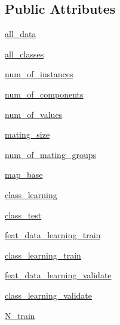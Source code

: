 \subsection*{Public Attributes}
\begin{DoxyCompactItemize}
\item 
\hyperlink{classmate__learning_1_1_mate_finder_a7347330ac72c85afd3f9fca87640d294}{all\+\_\+data}
\item 
\hyperlink{classmate__learning_1_1_mate_finder_a964c20920e14dfc4d5091142d429fe06}{all\+\_\+classes}
\item 
\hyperlink{classmate__learning_1_1_mate_finder_aeb435fdde37e9ac0cf72d03c25369201}{num\+\_\+of\+\_\+instances}
\item 
\hyperlink{classmate__learning_1_1_mate_finder_aaf6a72d379804901e89dc1c3e5ae5fd4}{num\+\_\+of\+\_\+components}
\item 
\hyperlink{classmate__learning_1_1_mate_finder_ad876941a4f4bf2e1dda05bf4881861e4}{num\+\_\+of\+\_\+values}
\item 
\hyperlink{classmate__learning_1_1_mate_finder_ac9e474a0c97351549960cd8baf0bbe24}{mating\+\_\+size}
\item 
\hyperlink{classmate__learning_1_1_mate_finder_a56553c3120e135bb4a969fd445f6bf6b}{num\+\_\+of\+\_\+mating\+\_\+groups}
\item 
\hyperlink{classmate__learning_1_1_mate_finder_af4f8fcfed10a8658bf2216f0deab368e}{map\+\_\+base}
\item 
\hyperlink{classmate__learning_1_1_mate_finder_a1d13f05feb21a3e48bf8822bf9c9fa67}{class\+\_\+learning}
\item 
\hyperlink{classmate__learning_1_1_mate_finder_a3fe8edaa8b6704d94252c2d1fc5b3360}{class\+\_\+test}
\item 
\hyperlink{classmate__learning_1_1_mate_finder_a04fe666220e1331ae3c444f3e8f6e3d3}{feat\+\_\+data\+\_\+learning\+\_\+train}
\item 
\hyperlink{classmate__learning_1_1_mate_finder_affd9b58edbaaa1e91f130ce9fcef958e}{class\+\_\+learning\+\_\+train}
\item 
\hyperlink{classmate__learning_1_1_mate_finder_a52a62e61246856c4d2e613a29ed86a8d}{feat\+\_\+data\+\_\+learning\+\_\+validate}
\item 
\hyperlink{classmate__learning_1_1_mate_finder_a958fd7ea70befe493a1d7f3d383d50c6}{class\+\_\+learning\+\_\+validate}
\item 
\hyperlink{classmate__learning_1_1_mate_finder_ad1790fa1f3465a0986165e11474723e2}{N\+\_\+train}
\item 

\end{DoxyCompactItemize}
